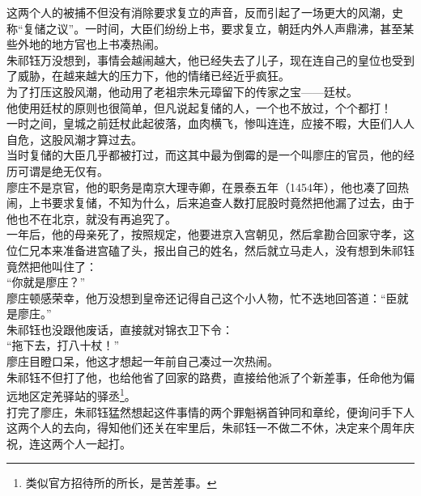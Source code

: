 \begin{multicols}{\theparacolNo}
这两个人的被捕不但没有消除要求复立的声音，反而引起了一场更大的风潮，史称“复储之议”。一时间，大臣们纷纷上书，要求复立，朝廷内外人声鼎沸，甚至某些外地的地方官也上书凑热闹。\\

朱祁钰万没想到，事情会越闹越大，他已经失去了儿子，现在连自己的皇位也受到了威胁，在越来越大的压力下，他的情绪已经近乎疯狂。\\

为了打压这股风潮，他动用了老祖宗朱元璋留下的传家之宝——廷杖。\\

他使用廷杖的原则也很简单，但凡说起复储的人，一个也不放过，个个都打！\\

一时之间，皇城之前廷杖此起彼落，血肉横飞，惨叫连连，应接不暇，大臣们人人自危，这股风潮才算过去。\\

当时复储的大臣几乎都被打过，而这其中最为倒霉的是一个叫廖庄的官员，他的经历可谓是绝无仅有。\\

廖庄不是京官，他的职务是南京大理寺卿，在景泰五年（1454年），他也凑了回热闹，上书要求复储，不知为什么，后来追查人数打屁股时竟然把他漏了过去，由于他也不在北京，就没有再追究了。\\

一年后，他的母亲死了，按照规定，他要进京入宫朝见，然后拿勘合回家守孝，这位仁兄本来准备进宫磕了头，报出自己的姓名，然后就立马走人，没有想到朱祁钰竟然把他叫住了：\\

“你就是廖庄？”\\

廖庄顿感荣幸，他万没想到皇帝还记得自己这个小人物，忙不迭地回答道：“臣就是廖庄。”\\

朱祁钰也没跟他废话，直接就对锦衣卫下令：\\

“拖下去，打八十杖！”\\

廖庄目瞪口呆，他这才想起一年前自己凑过一次热闹。\\

朱祁钰不但打了他，也给他省了回家的路费，直接给他派了个新差事，任命他为偏远地区定羌驿站的驿丞\footnote{类似官方招待所的所长，是苦差事。}。\\

打完了廖庄，朱祁钰猛然想起这件事情的两个罪魁祸首钟同和章纶，便询问手下人这两个人的去向，得知他们还关在牢里后，朱祁钰一不做二不休，决定来个周年庆祝，连这两个人一起打。\\


\end{multicols}
